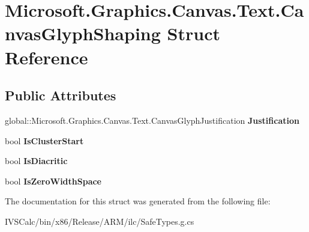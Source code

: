 \hypertarget{struct_microsoft_1_1_graphics_1_1_canvas_1_1_text_1_1_canvas_glyph_shaping}{}\section{Microsoft.\+Graphics.\+Canvas.\+Text.\+Canvas\+Glyph\+Shaping Struct Reference}
\label{struct_microsoft_1_1_graphics_1_1_canvas_1_1_text_1_1_canvas_glyph_shaping}
\subsection*{Public Attributes}
\begin{DoxyCompactItemize}
\item 
\mbox{\label{struct_microsoft_1_1_graphics_1_1_canvas_1_1_text_1_1_canvas_glyph_shaping_ab9d91988062bb45960d31da91e855b44}} 
global\+::\+Microsoft.\+Graphics.\+Canvas.\+Text.\+Canvas\+Glyph\+Justification {\bfseries Justification}
\item 
\mbox{\label{struct_microsoft_1_1_graphics_1_1_canvas_1_1_text_1_1_canvas_glyph_shaping_a34e7f928ff24c5973fe69c726789e347}} 
bool {\bfseries Is\+Cluster\+Start}
\item 
\mbox{\label{struct_microsoft_1_1_graphics_1_1_canvas_1_1_text_1_1_canvas_glyph_shaping_a9927979363c49c111facf86b6e57650d}} 
bool {\bfseries Is\+Diacritic}
\item 
\mbox{\label{struct_microsoft_1_1_graphics_1_1_canvas_1_1_text_1_1_canvas_glyph_shaping_ac495d298d9db2201995f6a164fe36a13}} 
bool {\bfseries Is\+Zero\+Width\+Space}
\end{DoxyCompactItemize}


The documentation for this struct was generated from the following file\+:\begin{DoxyCompactItemize}
\item 
I\+V\+S\+Calc/bin/x86/\+Release/\+A\+R\+M/ilc/Safe\+Types.\+g.\+cs\end{DoxyCompactItemize}
